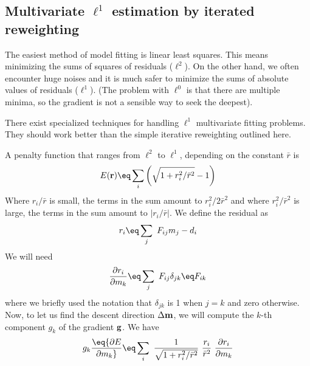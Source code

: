 \subsection{Multivariate $\ell^1$ estimation by iterated reweighting}
The easiest method of model fitting is linear least squares.
This means minimizing the sums of squares of residuals ($\ell^2$).
On the other hand, we often encounter huge noises
and it is much safer to minimize
the sums of absolute values of residuals
($\ell^1$).
(The problem with $\ell^0$ is that there are multiple minima,
so the gradient is not a sensible way to seek the deepest).

\par
There exist specialized techniques for handling $\ell^1$
multivariate fitting problems.
They should work better than the simple
iterative reweighting outlined here.


\par
A penalty function that ranges from $\ell^2$ to $\ell^1$,
depending on the constant $\bar r$ is
\begin{equation}
E(\bold r) \eq \sum_i \left( \sqrt{1+r_i^2/\bar r^2} - 1 \right)
\label{eqn:L12penalty}
\end{equation}
Where
$r_i/\bar r$
is small, the terms in the sum amount to $r_i^2/2\bar r^2$
and where
$r_i^2/\bar r^2$
is large, the terms in the sum amount to $|r_i/\bar r|$.
We define the residual as
\begin{equation}
r_i \eq \sum_j \ F_{ij}m_j - d_i
\label{eqn:usualres}
\end{equation}
We will need
\begin{equation}
{\partial r_i\over\partial m_k}
\eq \sum_j \ F_{ij} \delta_{jk} \eq F_{ik}
\label{eqn:partialroverm}
\end{equation}
where we briefly used the notation that $\delta_{jk}$ is 1 when
$j=k$ and zero otherwise.
Now,
to let us find the descent direction $\Delta \bold m$,
we will compute
the $k$-th component $g_k$ of the gradient $\bold g$.
We have
\begin{equation}
g_k \eq
{\partial E \over\partial m_k}
\eq \sum_i \ {1\over\sqrt{1+r_i^2/\bar r^2}}\ 
{ r_i \over \bar r^2}
\ 
{\partial r_i\over\partial m_k}
\label{eqn:morel1}
\end{equation}

